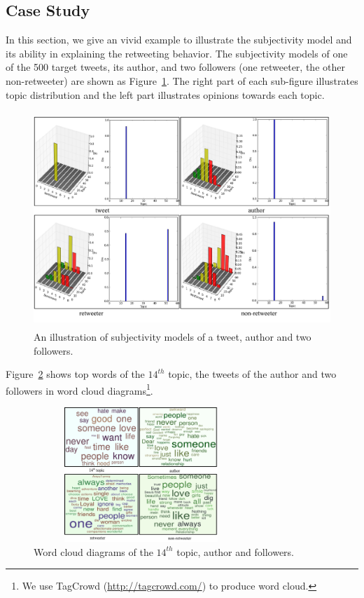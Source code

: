 \documentclass[letterpaper]{article}
\begin{document}
\subsection{Case Study}
\label{example}
In this section, we give an vivid example to illustrate the subjectivity model and its ability in explaining the retweeting behavior. 
The subjectivity models of one of the 500 target tweets, its author, and two followers (one retweeter, the other non-retweeter) are shown as Figure~\ref{fig5}. 
The right part of each sub-figure illustrates topic distribution and the left part illustrates opinions towards each topic. 
\begin{figure}[htb]
\centering
\includegraphics[width=5.5in,height=3.2in]{fig5.pdf}
\caption{An illustration of subjectivity models of a tweet, author and two followers.}
\label{fig5}
\end{figure}
Figure~\ref{fig6} shows top words of the $ 14^{th} $ topic, the tweets of the author and two followers in word cloud diagrams\footnote{We use TagCrowd (\url{http://tagcrowd.com/}) to produce word cloud.}.
\begin{figure}[htb]
\centering
\includegraphics[width=3.2in,height=2.0in]{fig6.pdf}
\caption{Word cloud diagrams of the $ 14^{th} $ topic, author and followers.}
\label{fig6}
\end{figure}
\end{document}
